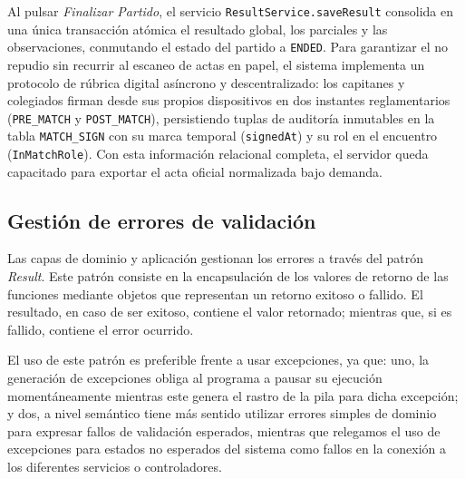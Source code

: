 Al pulsar \textit{Finalizar Partido}, el servicio \texttt{ResultService.saveResult} consolida en una única transacción atómica el resultado global, los parciales y las observaciones, conmutando el estado del partido a \texttt{ENDED}. Para garantizar el no repudio sin recurrir al escaneo de actas en papel, el sistema implementa un protocolo de rúbrica digital asíncrono y descentralizado: los capitanes y colegiados firman desde sus propios dispositivos en dos instantes reglamentarios (\texttt{PRE\_MATCH} y \texttt{POST\_MATCH}), persistiendo tuplas de auditoría inmutables en la tabla \texttt{MATCH\_SIGN} con su marca temporal (\texttt{signedAt}) y su rol en el encuentro (\texttt{InMatchRole}). Con esta información relacional completa, el servidor queda capacitado para exportar el acta oficial normalizada bajo demanda.

\subsection{Gestión de errores de validación}
Las capas de dominio y aplicación gestionan los errores a través del patrón \emph{Result}. Este patrón consiste en la encapsulación de los valores de retorno de las funciones mediante objetos que representan un retorno exitoso o fallido. El resultado, en caso de ser exitoso, contiene el valor retornado; mientras que, si es fallido, contiene el error ocurrido.

El uso de este patrón es preferible frente a usar excepciones, ya que: uno, la generación de excepciones obliga al programa a pausar su ejecución momentáneamente mientras este genera el rastro de la pila para dicha excepción; y dos, a nivel semántico tiene más sentido utilizar errores simples de dominio para expresar fallos de validación esperados, mientras que relegamos el uso de excepciones para estados no esperados del sistema como fallos en la conexión a los diferentes servicios o controladores.

